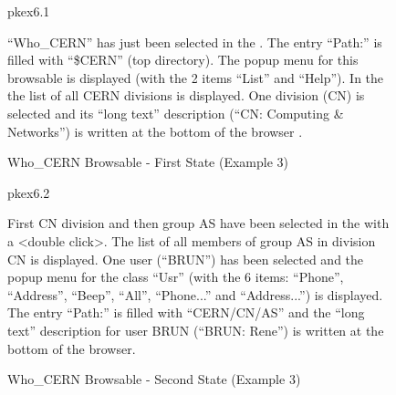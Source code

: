 \begin{figure}[hp]
\begin{PICTf}[.6] {pkex6.1}
\begin{DLsf}{}
\item[]
``Who\_CERN'' has just been selected in the \BW{}. The entry ``Path:'' 
 is filled with ``\$CERN'' (top directory). 
The popup menu for this browsable  is displayed (with the
2 items ``List'' and ``Help''). In the \OW{}  the list of all 
CERN divisions
is displayed. One division (CN) is selected and its ``long text'' description
(``CN: Computing \& Networks'') is written at the bottom of the browser
.
\end{DLsf}
\end{PICTf}
\caption{Who\_CERN Browsable - First State (Example 3)}
\label{ref:FIGPKEX61}

\begin{PICTf}[.6] {pkex6.2}
\begin{DLsf}{}
\item[]
First CN division and then group AS have been selected in the \OW{} 
with a <double click>. The list of all members of group AS in division CN is 
displayed. One user (``BRUN'')  has been selected and the popup menu 
for the class ``Usr''  (with the 6 items: ``Phone'', ``Address'', 
``Beep'', ``All'', ``Phone...'' and ``Address...'') is displayed.
The entry ``Path:''  is filled with
``\dollar CERN/CN/AS'' and the ``long text'' description for user BRUN 
(``BRUN: Rene'')  is written at the bottom of the browser.
\end{DLsf}
\end{PICTf}
\caption{Who\_CERN Browsable - Second State (Example 3)}
\label{ref:FIGPKEX62}
\end{figure}

